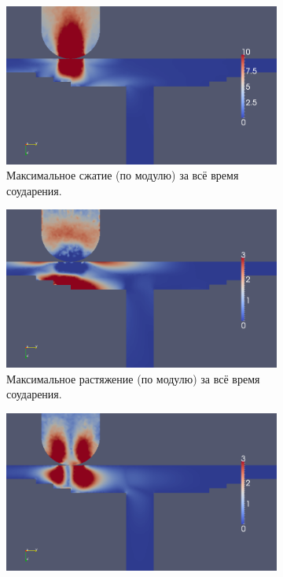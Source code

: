 \begin{figure}[h]
\begin{subfigure}[b]{0.5\textwidth}
\centering
\includegraphics[width=\textwidth]{png/pkm-experiment/wing-stringer-non-center/compression.png}
\caption{Максимальное сжатие (по модулю) за всё время соударения.}
\end{subfigure}
\begin{subfigure}[b]{0.5\textwidth}
\centering
\includegraphics[width=\textwidth]{png/pkm-experiment/wing-stringer-non-center/tension.png}
\caption{Максимальное растяжение (по модулю) за всё время соударения.}
\end{subfigure}
\begin{subfigure}[b]{0.5\textwidth}
\centering
\includegraphics[width=\textwidth]{png/pkm-experiment/wing-stringer-non-center/shear.png}

\end{subfigure}
\end{figure}
